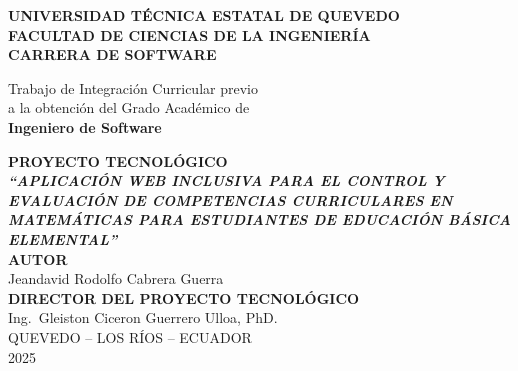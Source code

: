 \documentclass[12pt,a4paper,oneside]{report}
\begin{document}

\begin{titlepage}
\thispagestyle{empty}
\begin{center}

\vspace*{0.5cm}


{\Large\bfseries UNIVERSIDAD TÉCNICA ESTATAL DE QUEVEDO}\\[0.5cm]
{\Large\bfseries FACULTAD DE CIENCIAS DE LA INGENIERÍA}\\[0.5cm]
{\Large\bfseries CARRERA DE SOFTWARE}\\[2cm]

\begin{flushright}
\begin{minipage}{0.65\textwidth}
\raggedleft
Trabajo de Integración Curricular previo\\
a la obtención del Grado Académico de\\
\textbf{Ingeniero de Software}
\end{minipage}
\end{flushright}

\vspace{1.8cm}

{\large\bfseries PROYECTO TECNOLÓGICO}\\[1cm]

{\large\bfseries\itshape ``APLICACIÓN WEB INCLUSIVA PARA EL CONTROL Y EVALUACIÓN DE COMPETENCIAS CURRICULARES EN MATEMÁTICAS PARA ESTUDIANTES DE EDUCACIÓN BÁSICA ELEMENTAL''}\\[2cm]

{\textbf{AUTOR}}\\[0.3cm]
Jeandavid Rodolfo Cabrera Guerra\\[1.5cm]

{\textbf{DIRECTOR DEL PROYECTO TECNOLÓGICO}}\\[0.3cm]
Ing.\ Gleiston Ciceron Guerrero Ulloa, PhD.\\[2cm]

QUEVEDO -- LOS RÍOS -- ECUADOR\\[0.4cm]
2025

\end{center}
\end{titlepage}
\end{document}
